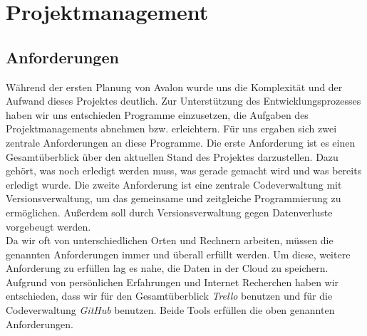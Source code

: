 
\chapter{Projektmanagement}


\section{Anforderungen}

Während der ersten Planung von Avalon wurde uns die Komplexität und der Aufwand dieses Projektes deutlich. Zur Unterstützung des Entwicklungsprozesses haben wir uns entschieden Programme einzusetzen, die Aufgaben des Projektmanagements abnehmen bzw. erleichtern.
Für uns ergaben sich zwei zentrale Anforderungen an diese Programme. Die erste Anforderung ist es einen Gesamtüberblick über den aktuellen Stand des Projektes darzustellen. Dazu gehört, was  noch erledigt werden muss, was  gerade gemacht wird und was  bereits erledigt wurde.
Die zweite Anforderung ist eine zentrale Codeverwaltung mit Versionsverwaltung, um das gemeinsame und zeitgleiche Programmierung zu ermöglichen. Außerdem soll durch Versionsverwaltung gegen Datenverluste vorgebeugt werden.\\
Da wir oft von unterschiedlichen Orten und Rechnern arbeiten, müssen die genannten Anforderungen immer und überall erfüllt werden. Um diese, weitere Anforderung zu erfüllen lag es nahe, die Daten in der Cloud zu speichern.\\
Aufgrund von persönlichen Erfahrungen und Internet Recherchen haben wir entschieden, dass wir für den Gesamtüberblick \textit{Trello} benutzen und für die Codeverwaltung \textit{GitHub} benutzen. Beide Tools erfüllen die oben genannten Anforderungen.



